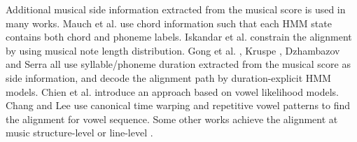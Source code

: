 Additional musical side information extracted from the musical score is used in many works. Mauch et al.  use chord information such that each \gls{HMM} state contains both chord and phoneme labels. Iskandar et al.  constrain the alignment by using musical note length distribution. Gong et al. , Kruspe , Dzhambazov and Serra  all use syllable/phoneme duration extracted from the musical score as side information, and decode the alignment path by duration-explicit \gls{HMM} models. Chien et al.  introduce an approach based on vowel likelihood models. Chang and Lee  use canonical time warping and repetitive vowel patterns to find the alignment for vowel sequence. Some other works achieve the alignment at music structure-level  or line-level .


